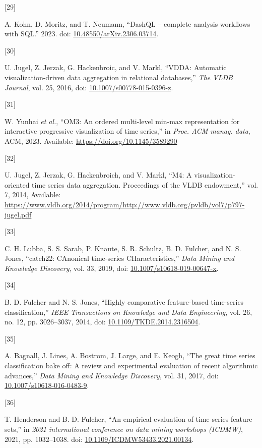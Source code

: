\documentclass{article}
\newlength{\cslhangindent}
\newlength{\csllabelwidth}
\newlength{\cslentryspacingunit} %
\newenvironment{CSLReferences}[2] %
 {%
  \setlength{\parindent}{0pt}
  \ifodd #1
  \let\oldpar\par
  \def\par{\hangindent=\cslhangindent\oldpar}
  \fi
  \setlength{\parskip}{#2\cslentryspacingunit}
 }%
 {}
\newcommand{\CSLLeftMargin}[1]{\parbox[t]{\csllabelwidth}{#1}}
\newcommand{\CSLRightInline}[1]{\parbox[t]{\linewidth - \csllabelwidth}{#1}\break}
\begin{document}
\begin{CSLReferences}{0}{0}
\leavevmode{}%
\CSLLeftMargin{{[}29{]} }
\CSLRightInline{A. Kohn, D. Moritz, and T. Neumann, {``DashQL --
complete analysis workflows with SQL.''} 2023. doi:
\href{https://doi.org/10.48550/arXiv.2306.03714}{10.48550/arXiv.2306.03714}.}

\leavevmode{}%
\CSLLeftMargin{{[}30{]} }
\CSLRightInline{U. Jugel, Z. Jerzak, G. Hackenbroic, and V. Markl,
{``VDDA: Automatic visualization-driven data aggregation in relational
databases,''} \emph{The VLDB Journal}, vol. 25, 2016, doi:
\href{https://doi.org/10.1007/s00778-015-0396-z}{10.1007/s00778-015-0396-z}.}

\leavevmode{}%
\CSLLeftMargin{{[}31{]} }
\CSLRightInline{W. Yunhai \emph{et al.}, {``OM3: An ordered multi-level
min-max representation for interactive progressive visualization of time
series,''} in \emph{Proc. ACM manag. data}, ACM, 2023. Available:
\url{https://doi.org/10.1145/3589290}}

\leavevmode{}%
\CSLLeftMargin{{[}32{]} }
\CSLRightInline{U. Jugel, Z. Jerzak, G. Hackenbroich, and V. Markl,
{``M4: A visualization-oriented time series data aggregation.
Proceedings of the VLDB endowment,''} vol. 7, 2014, Available:
\url{https://www.vldb.org/2014/program/http://www.vldb.org/pvldb/vol7/p797-jugel.pdf}}

\leavevmode{}%
\CSLLeftMargin{{[}33{]} }
\CSLRightInline{C. H. Lubba, S. S. Sarab, P. Knaute, S. R. Schultz, B.
D. Fulcher, and N. S. Jones, {``catch22: CAnonical time-series
CHaracteristics,''} \emph{Data Mining and Knowledge Discovery}, vol. 33,
2019, doi:
\href{https://doi.org/10.1007/s10618-019-00647-x}{10.1007/s10618-019-00647-x}.}

\leavevmode{}%
\CSLLeftMargin{{[}34{]} }
\CSLRightInline{B. D. Fulcher and N. S. Jones, {``Highly comparative
feature-based time-series classification,''} \emph{IEEE Transactions on
Knowledge and Data Engineering}, vol. 26, no. 12, pp. 3026--3037, 2014,
doi:
\href{https://doi.org/10.1109/TKDE.2014.2316504}{10.1109/TKDE.2014.2316504}.}

\leavevmode{}%
\CSLLeftMargin{{[}35{]} }
\CSLRightInline{A. Bagnall, J. Lines, A. Bostrom, J. Large, and E.
Keogh, {``The great time series classification bake off: A review and
experimental evaluation of recent algorithmic advances,''} \emph{Data
Mining and Knowledge Discovery}, vol. 31, 2017, doi:
\href{https://doi.org/10.1007/s10618-016-0483-9}{10.1007/s10618-016-0483-9}.}

\leavevmode{}%
\CSLLeftMargin{{[}36{]} }
\CSLRightInline{T. Henderson and B. D. Fulcher, {``An empirical
evaluation of time-series feature sets,''} in \emph{2021 international
conference on data mining workshops (ICDMW)}, 2021, pp. 1032--1038. doi:
\href{https://doi.org/10.1109/ICDMW53433.2021.00134}{10.1109/ICDMW53433.2021.00134}.}

\end{CSLReferences}



\end{document}
